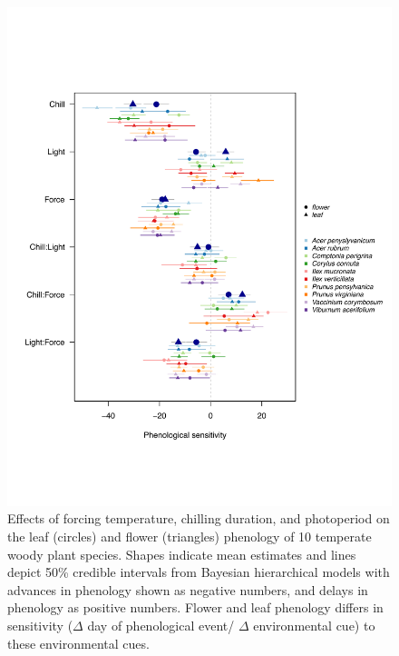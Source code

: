 \documentclass[11pt]{article}\usepackage[]{graphicx}\usepackage[]{color}
\begin{document}
\begin{figure}[h!]
    \centering
         \includegraphics[width=\textwidth]{..//Plots/Flobuds_manuscript_figs/budburstvsflowering.pdf}
         \caption{ Effects of forcing temperature, chilling duration, and photoperiod on the leaf (circles) and flower (triangles) phenology of 10 temperate woody plant species. Shapes indicate mean estimates and lines depict 50\% credible intervals from Bayesian hierarchical models with advances in phenology shown as negative numbers, and delays in phenology as positive numbers. Flower and leaf phenology differs in sensitivity ($\Delta$ day of phenological event/ $\Delta$ environmental cue) to these environmental cues.}
    \label{fig:model}
\end{figure}
\end{document}
